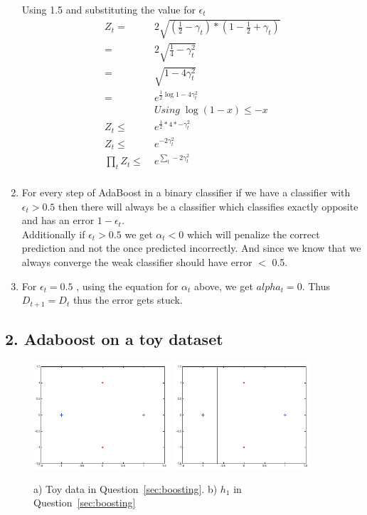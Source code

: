 \documentclass[english]{article}
\begin{document}
\begin{enumerate}
Using 1.5  and substituting the value for $\epsilon_t$ \\
\begin{align*}
	Z_t =&\; 2 \sqrt{ (\frac{1}{2} - \gamma_t) * (1 - \frac{1}{2} + \gamma_t)} \\
	=&\; 2 \sqrt {\frac{1}{4} - \gamma_t^2} \\
	=&\; \sqrt{1 - 4 \gamma_t^2} \\
	=&\; e^{ \frac{1}{2} \log{1 - 4 \gamma_t^2}} \\
	&\;Using \;  \log(1-x)\leq -x \\
	Z_t \leq &\; e^{\frac{1}{2} * 4 * - \gamma_t^2} \\
	Z_t \leq &\; e^{-2 \gamma_t^2 } \\
	\prod_t Z_t \leq &\; e^{\sum_t -2 \gamma_t^2} \\
\end{align*}

\item For every step of AdaBoost in a binary classifier if we have a classifier with $\epsilon_t >0.5$ then there will always be a classifier which classifies exactly opposite and has an error $1 - \epsilon_t$.\\
Additionally if $\epsilon_t > 0.5$ we get $\alpha_t < 0$ which will penalize the correct prediction and not the once predicted incorrectly. And since we know that we always converge the weak classifier should have error $<$ 0.5.


\item For $\epsilon_t = 0.5$ , using the equation for $\alpha_t$ above, we get $alpha_t = 0$. Thus $D_{t+1} = D_t$ thus the error gets stuck.
\end{enumerate}

\subsection*{2. Adaboost on a toy dataset}

\begin{figure}[t]
  \begin{center}
    \includegraphics[width=2in]{images/toydata}
    \includegraphics[width=2in]{images/toydata_with_h1}
  \end{center}
  \caption{a) Toy data in Question~\ref{sec:boosting}. b) $h_1$ in Question~\ref{sec:boosting}}
  \label{fig:toydata}
\end{figure}
\end{document}
